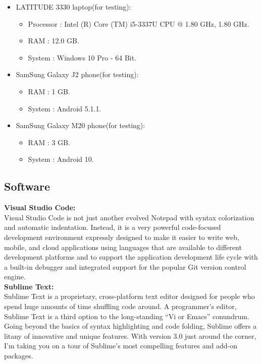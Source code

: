\begin{itemize}
	\item LATITUDE 3330 laptop(for testing):
	\begin{itemize}
		\item Processor : Intel (R) Core (TM) i5-3337U CPU @ 1.80 GHz, 1.80 GHz.
		\item RAM : 12.0 GB.
		\item System : Windows 10 Pro - 64 Bit.
	\end{itemize}
\end{itemize}

\begin{itemize}
	\item SamSung Galaxy J2 phone(for testing):
	\begin{itemize}
		\item RAM : 1 GB.
		\item System : Android 5.1.1.
	\end{itemize}
\end{itemize}

\begin{itemize}
	\item SamSung Galaxy M20 phone(for testing):
	\begin{itemize}
		\item RAM : 3 GB.
		\item System : Android 10.
	\end{itemize}
\end{itemize}



\subsection{Software}

\textbf{\noindent	Visual Studio Code:\\}
\indent Visual Studio Code is not just another evolved Notepad with syntax colorization and automatic indentation. Instead, it is a very powerful code-focused development
 environment expressly designed to make it easier to write web, mobile, and cloud applications using languages that are available to different development platforms and
  to support the application development life cycle with a built-in debugger and integrated support for the popular Git version control engine.\cite{Del_Sole2021-cv}\\

\textbf{\noindent Sublime Text:\\}
\indent Sublime Text is a proprietary, cross-platform text editor designed for people who spend huge amounts of time shuffling code around. A programmer's editor,
 Sublime Text is a third option to the long-standing “Vi or Emacs” conundrum. Going beyond the basics of syntax highlighting and code folding, Sublime offers a 
 litany of innovative and unique features. With version 3.0 just around the corner, I'm taking you on a tour of Sublime's most compelling features and add-on packages.\cite{kinder2013sublime}\\


